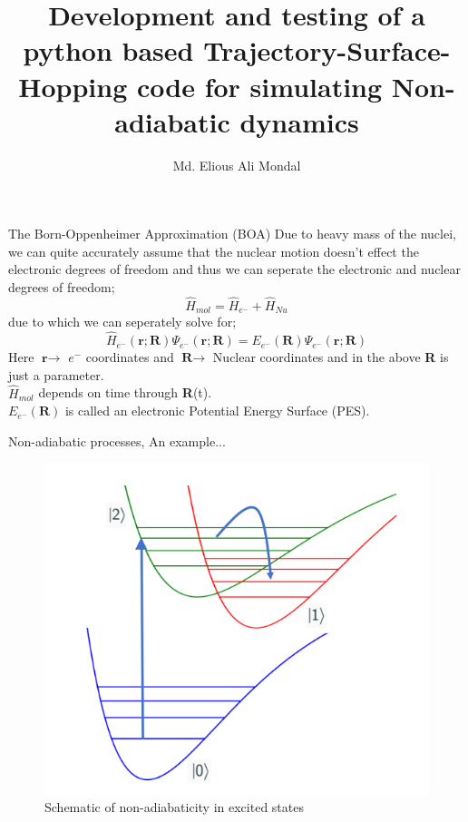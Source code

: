 \documentclass{beamer}
\title{Development and testing of a python based Trajectory-Surface-Hopping code for simulating Non-adiabatic dynamics}
\author{Md. Elious Ali Mondal}
\date{}
\begin{document}

	\begin{frame}
	\titlepage
	\end{frame}
	
	\begin{frame}[t]{The Born-Oppenheimer Approximation (BOA)}
	Due to heavy mass of the nuclei, we can quite accurately assume that the nuclear motion doesn't effect the electronic degrees of freedom and thus we can seperate the electronic and nuclear degrees of freedom;
	\begin{equation}
	\hat{H}_{mol} = \hat{H}_{e^-} + \hat{H}_{Nu}
	\end{equation}
	due to which we can seperately solve for;
	\begin{equation}
	\hat{H}_{e^-}(\textbf{r};\textbf{R})\Psi_{e^-}(\textbf{r};\textbf{R}) = E_{e^-}(\textbf{R})\Psi_{e^-}(\textbf{r};\textbf{R})
	\end{equation}
	Here $\textbf{r}\rightarrow$ $e^-$ coordinates and $\textbf{R}\rightarrow$ Nuclear coordinates and in the above \textbf{R} is just a parameter.\\ $\hat{H}_{mol}$ depends on time through \textbf{R}(t).\\ $E_{e^-}(\textbf{R})$ is called an electronic Potential Energy Surface (PES).
	\end{frame}	
	
	\begin{frame}[t]{Non-adiabatic processes, An example...}
	\begin{figure}
	\includegraphics[scale=0.50]{NAD.png}
	\caption{Schematic of non-adiabaticity in excited states}
	\end{figure}
	\end{frame}
	
\end{document}

